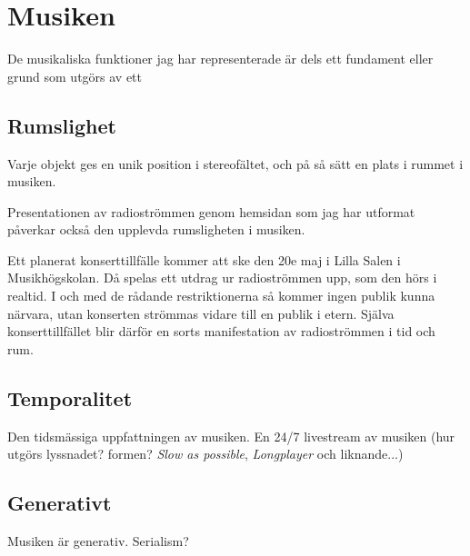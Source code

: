 \documentclass[11pt, a4paper]{article} %
\begin{document}
\section*{Musiken}



De musikaliska funktioner jag har representerade är dels ett fundament eller grund som utgörs av ett 


\subsection*{Rumslighet}
Varje objekt ges en unik position i stereofältet, och på så sätt en plats i rummet i musiken. 

Presentationen av radioströmmen genom hemsidan som jag har utformat påverkar också den upplevda rumsligheten i musiken. 

Ett planerat konserttillfälle kommer att ske den 20e maj i Lilla Salen i Musikhögskolan. Då spelas ett utdrag ur radioströmmen upp, som den hörs i realtid. I och med de rådande restriktionerna så kommer ingen publik kunna närvara, utan konserten strömmas vidare till en publik i etern. Själva konserttillfället blir därför en sorts manifestation av radioströmmen i tid och rum. 




\subsection*{Temporalitet}
Den tidsmässiga uppfattningen av musiken. En 24/7 livestream av musiken (hur utgörs lyssnadet? formen? \emph{Slow as possible}, \emph{Longplayer} och liknande...)

\subsection*{Generativt}
Musiken är generativ. Serialism?
\end{document}
